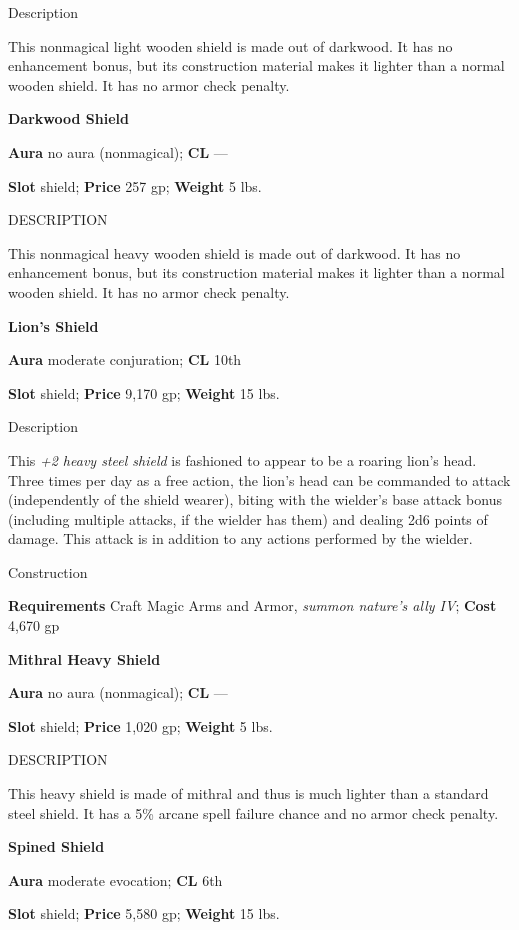 Description
				
This nonmagical light wooden shield is made out of darkwood. It has no enhancement bonus, but its construction material makes it lighter than a normal wooden shield. It has no armor check penalty. 
				
\textbf{Darkwood Shield}
				
\textbf{Aura} no aura (nonmagical); \textbf{CL} ---
				
\textbf{Slot} shield; \textbf{Price} 257 gp; \textbf{Weight} 5 lbs.
				
DESCRIPTION
				
This nonmagical heavy wooden shield is made out of darkwood. It has no enhancement bonus, but its construction material makes it lighter than a normal wooden shield. It has no armor check penalty. 
				
\textbf{Lion's Shield}
				
\textbf{Aura} moderate conjuration; \textbf{CL }10th
				
\textbf{Slot} shield; \textbf{Price} 9,170 gp; \textbf{Weight} 15 lbs.
				
Description
				
This \textit{+2 heavy steel shield }is fashioned to appear to be a roaring lion's head. Three times per day as a free action, the lion's head can be commanded to attack (independently of the shield wearer), biting with the wielder's base attack bonus (including multiple attacks, if the wielder has them) and dealing 2d6 points of damage. This attack is in addition to any actions performed by the wielder.
				
Construction
				
\textbf{Requirements} Craft Magic Arms and Armor, \textit{summon nature's ally IV}; \textbf{Cost} 4,670 gp
				
\textbf{Mithral Heavy Shield}
				
\textbf{Aura} no aura (nonmagical); \textbf{CL} ---
				
\textbf{Slot} shield; \textbf{Price} 1,020 gp; \textbf{Weight} 5 lbs.
				
DESCRIPTION
				
This heavy shield is made of mithral and thus is much lighter than a standard steel shield. It has a 5\% arcane spell failure chance and no armor check penalty.
				
\textbf{Spined Shield}
				
\textbf{Aura} moderate evocation; \textbf{CL} 6th
				
\textbf{Slot} shield; \textbf{Price} 5,580 gp; \textbf{Weight }15 lbs.
				
